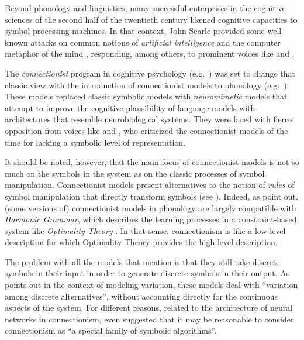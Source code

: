 Beyond phonology and linguistics, many successful enterprises in the cognitive sciences of the second half of the twentieth century likened cognitive capacities to symbol-processing machines.
In that context, John Searle provided some well-known attacks on common notions of \textit{artificial intelligence} \citep{searle1980minds} and the computer metaphor of the mind \citep{searle1990cognitive}, responding, among others, to prominent voices like \citet{fodor1983modularity, pylyshyn1985computation} and \citet{cummins1983nature}.

\begin{sloppypar}
The \emph{connectionist} program in cognitive psychology (e.g.~\citealt{rumelhart1986parallel1, rumelhart1986parallel2, bates1993counectionism}) was set to change that classic view with the introduction of connectionist models to phonology (e.g.~\citealt{goldsmith1992local, joanisse2000connectionist, laks1995connectionistsk, smolensky2006harmonic, tupper2012sonoritysk}). These models replaced classic symbolic models with \emph{neuromimetic} models \citep[52]{laks1995connectionistsk} that attempt to improve the cognitive plausibility of language models with architectures that resemble neurobiological systems.
They were faced with fierce opposition from voices like \citet{fodor1988connectionism} and \citet{pinker1988onlanguage}, who criticized the connectionist models of the time for lacking a symbolic level of representation.
\end{sloppypar}

It should be noted, however, that the main focus of connectionist models is not so much on the symbols in the system as on the classic processes of symbol manipulation. Connectionist models present alternatives to the notion of \emph{rules} of symbol manipulation that directly transform symbols (see \citealt{harnad1990symbol}).
Indeed, as \citet{smolensky2006harmonic} point out, (some versions of) connectionist models in phonology are largely compatible with \emph{Harmonic Grammar}, which describes the learning processes in a constraint-based system like \emph{Optimality Theory} \citep{prince1993optimality}. In that sense, connectionism is like a low-level description for which Optimality Theory provides the high-level description.

The problem with all the models that \citet{smolensky2006harmonic} mention is that they still take discrete symbols in their input in order to generate discrete symbols in their output. As \citet[57]{gafos2006dynamics} points out in the context of modeling variation, these models deal with \enquote{variation among discrete alternatives}, without accounting directly for the continuous aspects of the system.
For different reasons, related to the architecture of neural networks in connectionism, \citet[337]{harnad1990symbol} even suggested that it may be reasonable to consider connectionism as \enquote{a special family of symbolic algorithms}.

